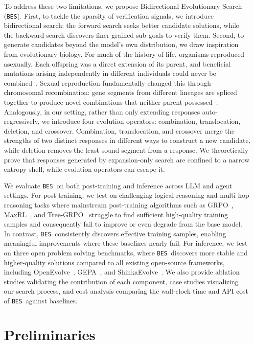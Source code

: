 \documentclass{llmxive}
\providecommand{\ours}{\texttt{BES}}
\begin{document}
To address these two limitations, we propose  Bidirectional Evolutionary Search (\ours). First, to tackle the sparsity of verification signals, we introduce bidirectional search: the forward search seeks better candidate solutions, while the backward search discovers finer-grained sub-goals to verify them.
Second, to generate candidates beyond the model's own distribution, we draw inspiration from evolutionary biology. 
For much of the history of life, organisms reproduced asexually. Each offspring was a direct extension of its parent, and beneficial mutations arising independently in different individuals could never be combined~\citep{naturalselection}. Sexual reproduction fundamentally changed this through chromosomal recombination: gene segments from different lineages are spliced together to produce novel combinations that neither parent possessed~\citep{sex}. Analogously, in our setting, rather than only extending responses auto-regressively, we introduce four evolution operators: combination, translocation, deletion, and crossover. Combination, translocation, and crossover merge the strengths of two distinct responses in different ways to construct a new candidate, while deletion removes the least sound segment from a response. We theoretically prove that responses generated by expansion-only search are confined to a narrow entropy shell, while evolution operators can escape it.

We evaluate \ours\ on both post-training and inference across LLM and agent settings. For post-training, we test on challenging logical reasoning and multi-hop reasoning tasks where mainstream post-training algorithms such as GRPO~\citep{dsr1}, MaxRL~\citep{maxrl}, and Tree-GRPO~\citep{treegrpo} struggle to find sufficient high-quality training samples and consequently fail to improve or even degrade from the base model. In contrast, \ours\ consistently discovers effective training samples, enabling meaningful improvements where these baselines nearly fail. For inference, we test on three open problem solving benchmarks, where \ours\ discovers more stable and higher-quality solutions compared to all existing open-source frameworks, including OpenEvolve~\citep{openevolve}, GEPA~\citep{gepa}, and ShinkaEvolve~\citep{shinkaevolve}. We also provide ablation studies validating the contribution of each component, case studies visualizing our search process, and cost analysis comparing the wall-clock time and API cost of \ours\ against baselines.

\section{Preliminaries}
\label{sec:problem}
\end{document}
